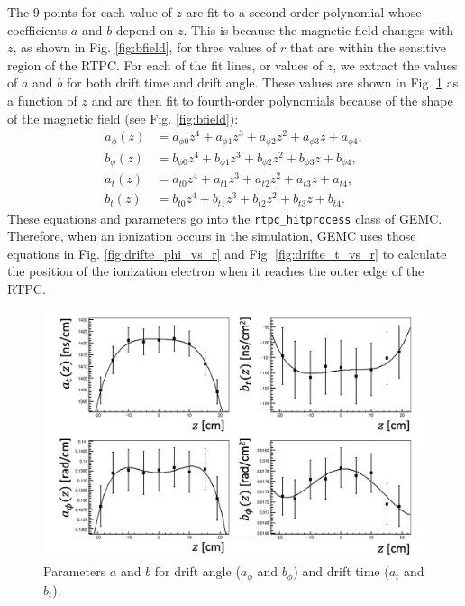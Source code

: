 The 9 points for each value of $z$ are fit to a second-order polynomial whose coefficients $a$ and $b$ depend on $z$. This is because the magnetic field changes with $z$, as shown in Fig. \ref{fig:bfield}, for three values of $r$ that are within the sensitive region of the RTPC. For each of the fit lines, or values of $z$, we extract the values of $a$ and $b$ for both drift time and drift angle. These values are shown in Fig. \ref{fig:drifte_a_and_b} as a function of $z$ and are then fit to fourth-order polynomials because of the shape of the magnetic field (see Fig. \ref{fig:bfield}):
\begin{eqnarray}\label{eqn:drifte_parameters}
\nonumber
a_{\phi}(z) &= a_{\phi0}z^4 +  a_{\phi1}z^3 +  a_{\phi2}z^2 +  a_{\phi3}z +  a_{\phi4}, \\
\nonumber
b_{\phi}(z) &= b_{\phi0}z^4 +  b_{\phi1}z^3 +  b_{\phi2}z^2 +  b_{\phi3}z +  b_{\phi4}, \\
\nonumber
a_t(z) &= a_{t0}z^4 +  a_{t1}z^3 +  a_{t2}z^2 +  a_{t3}z +  a_{t4}, \\
b_t(z) &= b_{t0}z^4 +  b_{t1}z^3 +  b_{t2}z^2 +  b_{t3}z +  b_{t4}.
\end{eqnarray}
These equations and parameters go into the \lstinline|rtpc_hitprocess| class of GEMC. Therefore, when an ionization occurs in the simulation, GEMC uses those equations in Fig. \ref{fig:drifte_phi_vs_r} and Fig. \ref{fig:drifte_t_vs_r} to calculate the position of the ionization electron when it reaches the outer edge of the RTPC.

\begin{figure}[h!]
	\centering
	\includegraphics[width=0.95\linewidth]{figures/drifte_a_and_b.png}
	\caption{Parameters $a$ and $b$ for drift angle ($a_{\phi}$ and $b_{\phi}$) and drift time ($a_t$ and $b_t$).}
	\label{fig:drifte_a_and_b}
\end{figure}

